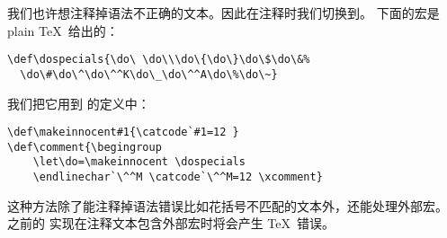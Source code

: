 \documentclass[letterpaper]{book}
\begin{document}
我们也许想注释掉语法不正确的文本。因此在注释时我们切换到。
下面的宏是 plain \TeX\ 给出的：
\begin{verbatim}
\def\dospecials{\do\ \do\\\do\{\do\}\do\$\do\&%
  \do\#\do\^\do\^^K\do\_\do\^^A\do\%\do\~}
\end{verbatim}
我们把它用到  的定义中：
\begin{verbatim}
\def\makeinnocent#1{\catcode`#1=12 }
\def\comment{\begingroup
    \let\do=\makeinnocent \dospecials
    \endlinechar`\^^M \catcode`\^^M=12 \xcomment}
\end{verbatim}
这种方法除了能注释掉语法错误比如花括号不匹配的文本外，还能处理外部宏。
之前的  实现在注释文本包含外部宏时将会产生 \TeX\ 错误。
\end{document}
